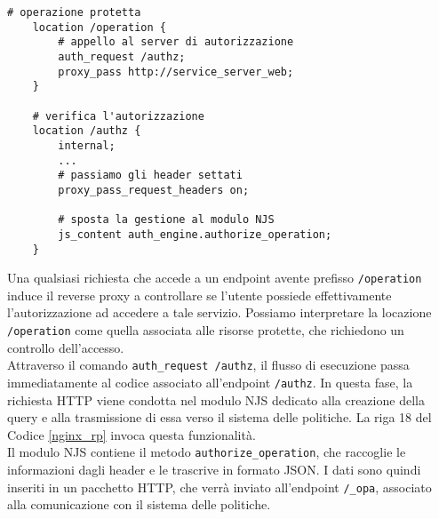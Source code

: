 \lstset{language=nginx}
\begin{lstlisting}[caption={[Frammento di codice principale del reverse proxy]Frammento di codice principale del reverse proxy. La locazione \texttt{/authz} gestisce e invia la richiesta a 
    OPA, e in base alla sua risposta inoltra la richiesta o meno attraverso la keyword \texttt{proxy\_pass}.},captionpos=b,label=nginx_rp]
    # operazione protetta
    location /operation {
        # appello al server di autorizzazione
        auth_request /authz; 
        proxy_pass http://service_server_web;
    }

    # verifica l'autorizzazione
    location /authz {
        internal;
        ...
        # passiamo gli header settati
        proxy_pass_request_headers on; 

        # sposta la gestione al modulo NJS  
        js_content auth_engine.authorize_operation;
    }
\end{lstlisting}
Una qualsiasi richiesta che accede a un endpoint avente prefisso \texttt{/operation} induce il reverse proxy a controllare 
se l'utente possiede effettivamente l'autorizzazione ad accedere a tale servizio. Possiamo interpretare la locazione \texttt{/operation}
come quella associata alle risorse protette, che richiedono un controllo dell'accesso. 
\\ Attraverso il comando \texttt{auth\_request /authz},
il flusso di esecuzione passa immediatamente al codice associato all'endpoint \texttt{/authz}. 
In questa fase, la richiesta HTTP viene condotta nel modulo NJS dedicato alla creazione della query e alla trasmissione di essa verso il sistema delle politiche.
La riga 18 del Codice \ref*{nginx_rp} invoca questa funzionalità. \\
Il modulo NJS contiene il metodo \texttt{authorize\_operation}, che raccoglie le informazioni dagli header 
e le trascrive in formato JSON.
I dati sono quindi inseriti in un pacchetto HTTP, che verrà inviato all'endpoint \texttt{/\_opa}, 
 associato alla comunicazione con il sistema delle politiche.
\lstset{language=nginx}
